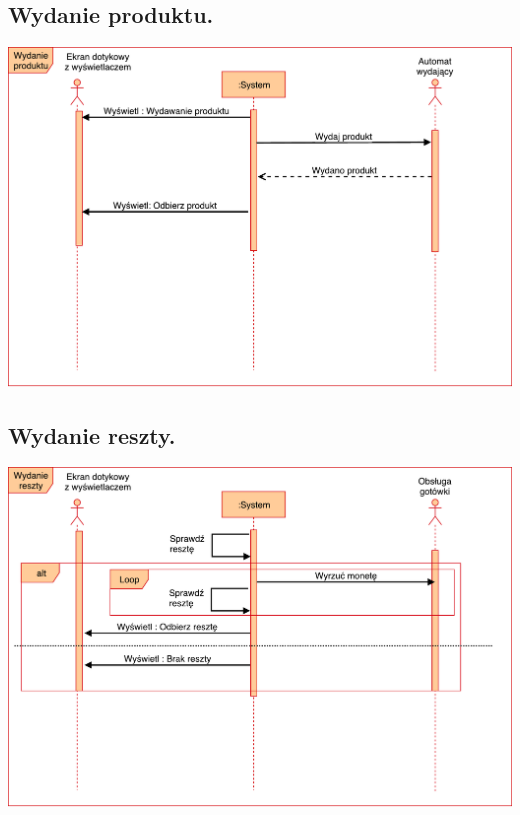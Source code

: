 \documentclass[11pt]{article}
\begin{document}
		\subsection{Wydanie produktu.}
		\begin{center}
			\includegraphics[scale=0.65]{WydanieProduktu.pdf}
		\end{center}
		
		\subsection{Wydanie reszty.}
		\begin{center}
			\includegraphics[scale=0.65]{WydanieReszty.pdf}
		\end{center}
		\newpage
\end{document}

